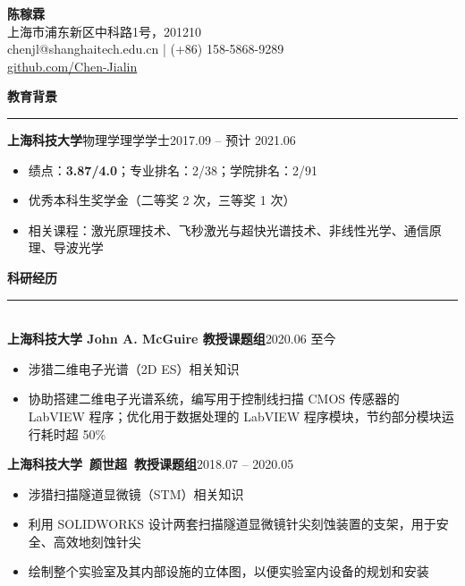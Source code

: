 \documentclass[letterpaper,11pt]{article}
\begin{document}
\begin{center}
    {\LARGE\bfseries{}陈稼霖}\\
    \vspace{1ex}
    上海市浦东新区中科路1号，201210\\
    chenjl@shanghaitech.edu.cn | (+86) 158-5868-9289\\
    \href{https://github.com/Chen-Jialin}{github.com/Chen-Jialin}\\
\end{center}

{\Large\bfseries{}教育背景}\\
\rule[1.5ex]{\textwidth}{1pt}
{\songti\large\bfseries{}上海科技大学}{\large\quad{}物理学\quad{}理学学士}\hfill{2017.09 -- 预计 2021.06}\\
\vspace{-4ex}
\begin{itemize}
    \item 绩点：{\bfseries{}3.87/4.0}；专业排名：2/38；学院排名：2/91
    \item 优秀本科生奖学金（二等奖 2 次，三等奖 1 次）
    \item 相关课程：激光原理技术、飞秒激光与超快光谱技术、非线性光学、通信原理、导波光学
\end{itemize}
\vspace{1ex}

{\Large\bfseries{}科研经历}\\
\rule[1.5ex]{\columnwidth}{1pt}\\
{\songti\large\bfseries{}上海科技大学 John A. McGuire 教授课题组}\hfill{2020.06 至今}\\
\vspace{-4ex}
\begin{itemize}
    \item 涉猎二维电子光谱（2D ES）相关知识
    \item 协助搭建二维电子光谱系统，编写用于控制线扫描 CMOS 传感器的 LabVIEW 程序；优化用于数据处理的 LabVIEW 程序模块，节约部分模块运行耗时超 50\%
\end{itemize}
{\songti\large\bfseries{}上海科技大学~颜世超~教授课题组}\hfill{2018.07 -- 2020.05}\\
\vspace{-4ex}
\begin{itemize}
    \item 涉猎扫描隧道显微镜（STM）相关知识
    \item 利用 SOLIDWORKS 设计两套扫描隧道显微镜针尖刻蚀装置的支架，用于安全、高效地刻蚀针尖
    \item 绘制整个实验室及其内部设施的立体图，以便实验室内设备的规划和安装
\end{itemize}
\vspace{1ex}
\end{document}
